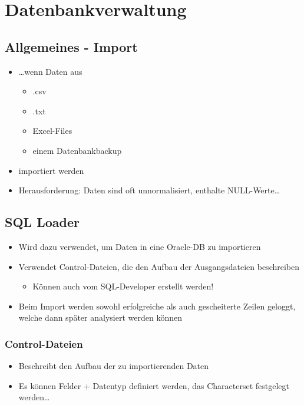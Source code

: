 \section{Datenbankverwaltung}
\subsection{Allgemeines - Import}
\begin{itemize}
    \item \dots wenn Daten aus
    \begin{itemize}
        \item .csv
        \item .txt
        \item Excel-Files
        \item einem Datenbankbackup
    \end{itemize}
    \item importiert werden
    \item Herausforderung: Daten sind oft unnormalisiert, enthalte NULL-Werte\dots
\end{itemize}

\subsection{SQL Loader}
\begin{itemize}
    \item Wird dazu verwendet, um Daten in eine Oracle-DB zu importieren
    \item Verwendet Control-Dateien, die den Aufbau der Ausgangsdateien beschreiben
    \begin{itemize}
        \item Können auch vom SQL-Developer erstellt werden!
    \end{itemize}
    \item Beim Import werden sowohl erfolgreiche als auch gescheiterte Zeilen geloggt, welche dann später analysiert werden können
\end{itemize}

\subsubsection{Control-Dateien}
\begin{itemize}
    \item Beschreibt den Aufbau der zu importierenden Daten
    \item Es können Felder + Datentyp definiert werden, das Characterset festgelegt werden\dots
\end{itemize}

